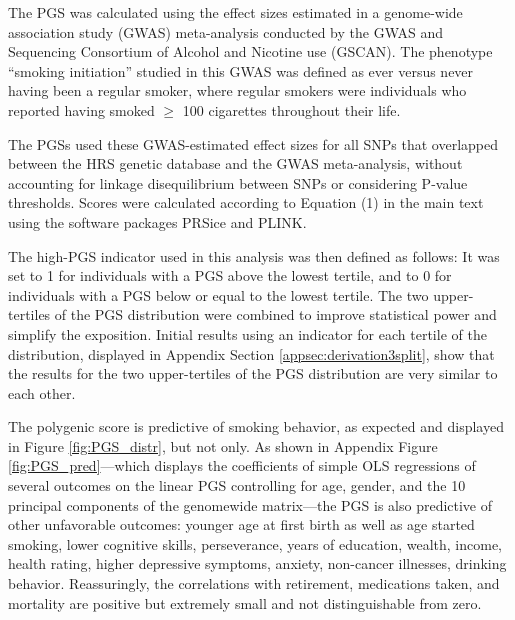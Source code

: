 The PGS was calculated using the effect sizes estimated in a genome-wide association study (GWAS) meta-analysis \cite{GSCAN2019gwas} conducted by the GWAS and Sequencing Consortium of Alcohol and Nicotine use (GSCAN).
The phenotype ``smoking initiation'' studied in this GWAS was defined as ever versus never having been a regular smoker, where regular smokers were individuals who reported having smoked $\geq$ 100 cigarettes throughout their life.

The PGSs used these GWAS-estimated effect sizes for all SNPs that overlapped between the HRS genetic database and the GWAS meta-analysis, without accounting for linkage disequilibrium between SNPs or considering P-value thresholds.
Scores were calculated according to Equation (1) in the main text using the software packages PRSice and PLINK.


The high-PGS indicator used in this analysis was then defined as follows: It was set to 1 for individuals with a PGS above the lowest tertile, and to 0 for individuals with a PGS below or equal to the lowest tertile.
The two upper-tertiles of the PGS distribution were combined to improve statistical power and simplify the exposition. Initial results using an indicator for each tertile of the distribution, displayed in Appendix Section \ref{appsec:derivation3split}, show that the results for the two upper-tertiles of the PGS distribution are very similar to each other.

The polygenic score is predictive of smoking behavior, as expected and displayed in Figure \ref{fig:PGS_distr}, but not only.
As shown in Appendix Figure \ref{fig:PGS_pred}---which displays the coefficients of simple OLS regressions of several outcomes on the linear PGS controlling for age, gender, and the 10 principal components of the genomewide matrix---the PGS is also predictive of other unfavorable outcomes: younger age at first birth as well as age started smoking, lower cognitive skills, perseverance, years of education, wealth, income, health rating, higher depressive symptoms, anxiety, non-cancer illnesses, drinking behavior.
Reassuringly, the correlations with retirement, medications taken, and mortality are positive but extremely small and not distinguishable from zero.

